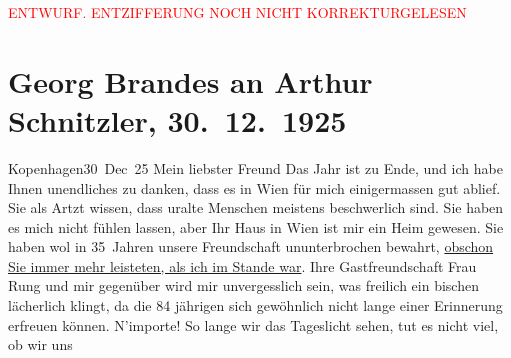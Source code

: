 
\begin{center}
            \textcolor{red}{ENTWURF. ENTZIFFERUNG NOCH NICHT KORREKTURGELESEN}
                      \end{center}
            
               \section[Georg Brandes an Arthur Schnitzler, 30. 12. 1925]{ Georg Brandes an Arthur Schnitzler, 30. 12. 1925}\nopagebreak{}\rehead{ }\begin{ledgroupsized}[t]{13cm}\normalsize\beginnumbering{} \toendnotes[C]{\smallbreak\pagebreak[2]} 
\pstart
           \raggedleft{}{\pb}Kopenhagen30 Dec 25\pend
           \pstart{}Mein liebster Freund\pend\pstart
           Das Jahr ist zu Ende, und ich habe Ihnen unendliches zu danken, dass es in Wien für mich einigermassen gut ablief. Sie als
                    Artzt wissen, dass uralte Menschen meistens beschwerlich sind. Sie haben es mich
                    nicht fühlen lassen, aber Ihr Haus in Wien ist
                    mir ein Heim gewesen. Sie haben wol in 35 Jahren unsere Freundschaft
                    ununterbrochen bewahrt, \uline{obschon Sie immer mehr
                        leisteten, als ich im Stande war}. Ihre Gastfreundschaft Frau Rung und mir {\pb}gegenüber wird mir
                    unvergesslich sein, was freilich ein bischen lächerlich klingt, da die 84
                    jährigen sich gewöhnlich nicht lange einer Erinnerung erfreuen können.\pend
           \pstart
           N’importe! So lange wir das Tageslicht sehen, tut es nicht viel, ob wir uns

\end{ledgroupsized}
